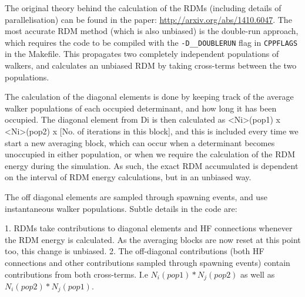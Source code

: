 \documentclass[a4paper,notitlepage]{scrreprt}
\let\code\lstinline
\begin{document}
The original theory behind the calculation of the RDMs (including details of parallelisation) can be found in the paper:
\url{http://arxiv.org/abs/1410.6047}. The most accurate RDM method (which is also unbiased) is the double-run approach, which requires
the code to be compiled with the \code{-D__DOUBLERUN} flag in \code{CPPFLAGS} in the Makefile. This propagates
two completely independent populations of walkers, and calculates an unbiased RDM by taking cross-terms
between the two populations.

The calculation of the diagonal elements is done by keeping track of the average walker populations of each
occupied determinant, and how long it has been occupied.  The diagonal element from Di is then calculated
as <Ni>(pop1) x <Ni>(pop2) x [No. of iterations in this block], and this is included every time we start a new
averaging block, which can occur when a determinant becomes unoccupied in either population, or when we require
the calculation of the RDM energy during the simulation. As such, the exact RDM accumulated is dependent on
the interval of RDM energy calculations, but in an unbiased way.

The off diagonal elements are sampled through spawning events, and use instantaneous walker populations.
Subtle details in the code are:

1. RDMs take contributions to diagonal elements and HF connections whenever the RDM energy is calculated.
   As the averaging blocks are now reset at this point too, this change is unbiased.
2. The off-diagonal contributions (both HF connections and other contributions sampled through spawning
   events) contain contributions from both cross-terms. I.e $N_i(pop1)*N_j(pop2)$ as well as
   $N_i(pop2)*N_j(pop1)$.
\end{document}

